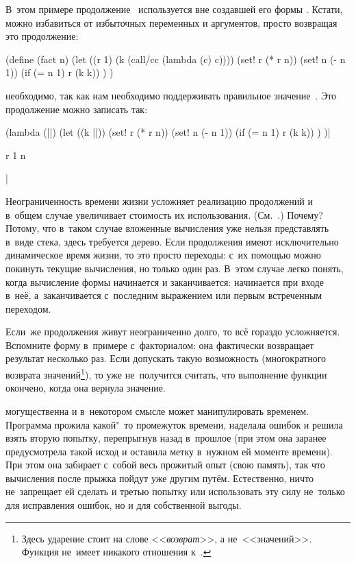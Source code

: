 В~этом примере продолжение~ используется вне создавшей его формы
. Кстати, можно избавиться от избыточных переменных и аргументов,
просто возвращая это продолжение:

\begin{code:lisp}
(define (fact n)
  (let ((r 1) (k (call/cc (lambda (c) c))))
    (set! r (* r n))
    (set! n (- n 1))
    (if (= n 1) r (k k)) ) )
\end{code:lisp}

  необходимо, так как нам необходимо поддерживать
правильное значение~. Это продолжение можно записать так:

\begin{code:lisp}
(lambda (||)
  (let ((k ||))
    (set! r (* r n))
    (set! n (- n 1))
    (if (= n 1) r (k k)) ) )|\begin{where}
                             \- r {\is} 1
                             \- n
                             \end{where}|
\end{code:lisp}

Неограниченность времени жизни усложняет реализацию продолжений и в~общем случае
увеличивает стоимость их использования. (См.~\cite{cho88,hdb90,mat92}.) Почему?
Потому, что в~таком случае вложенные вычисления уже нельзя представлять в~виде
стека, здесь требуется дерево. Если продолжения имеют исключительно динамическое
время жизни, то это просто переходы: с~их помощью можно покинуть текущие
вычисления, но только один раз. В~этом случае легко понять, когда вычисление
формы начинается и заканчивается: начинается при входе в~неё, а~заканчивается
с~последним выражением или первым встреченным переходом.

Если~же продолжения живут неограниченно долго, то всё гораздо усложняется.
Вспомните форму  в~примере с~факториалом: она фактически
возвращает результат несколько раз. Если допускать такую возможность
(многократного возврата значений\footnote{Здесь ударение стоит на слове
<<\emph{возврат}>>, а не~<<значений>>. Функция  не~имеет никакого
отношения к~.}), то уже не~получится считать, что выполнение
функции окончено, когда она вернула значение.

 могущественна и в~некотором смысле может манипулировать временем.
Программа прожила какой"~то промежуток времени, наделала ошибок и решила взять
вторую попытку, перепрыгнув назад в~прошлое (при этом она заранее предусмотрела
такой исход и оставила метку в~нужном ей моменте времени). При этом она забирает
с~собой весь прожитый опыт (свою память), так что вычисления после прыжка пойдут
уже другим путём. Естественно, ничто не~запрещает ей сделать и третью попытку
или использовать эту силу не~только для исправления ошибок, но и для собственной
выгоды.

